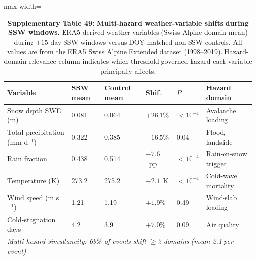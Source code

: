 \documentclass[11pt,letterpaper]{article}
\begin{document}
\begin{table}[!ht]
\centering
\caption{\textbf{Supplementary Table 49: Multi-hazard weather-variable shifts during SSW windows.}
ERA5-derived weather variables (Swiss Alpine domain-mean) during $\pm 15$-day SSW windows versus DOY-matched non-SSW controls. All values are from the ERA5 Swiss Alpine Extended dataset (1998--2019). Hazard-domain relevance column indicates which threshold-governed hazard each variable principally affects.}
\label{tab:multi_hazard_regime}
\small
\begin{adjustbox}{max width=\textwidth}
\begin{tabular}{llllll}
\toprule
\textbf{Variable} & \textbf{SSW mean} & \textbf{Control mean} & \textbf{Shift} & \textbf{$P$} & \textbf{Hazard domain} \\
\midrule
Snow depth SWE (m) & 0.081 & 0.064 & $+26.1\%$ & $< 10^{-4}$ & Avalanche loading \\
Total precipitation (mm d$^{-1}$) & 0.322 & 0.385 & $-16.5\%$ & 0.04 & Flood, landslide \\
Rain fraction & 0.438 & 0.514 & $-7.6$~pp & $< 10^{-4}$ & Rain-on-snow trigger \\
Temperature (K) & 273.2 & 275.2 & $-2.1$~K & $< 10^{-4}$ & Cold-wave mortality \\
Wind speed (m s$^{-1}$) & 1.21 & 1.19 & $+1.9\%$ & 0.49 & Wind-slab loading \\
Cold-stagnation days & 4.2 & 3.9 & $+7.0\%$ & 0.09 & Air quality \\
\midrule
\multicolumn{6}{l}{\textit{Multi-hazard simultaneity: 69\% of events shift $\geq$2 domains (mean 2.1 per event)}} \\
\bottomrule
\end{tabular}
\end{adjustbox}
\end{table}
\end{document}
